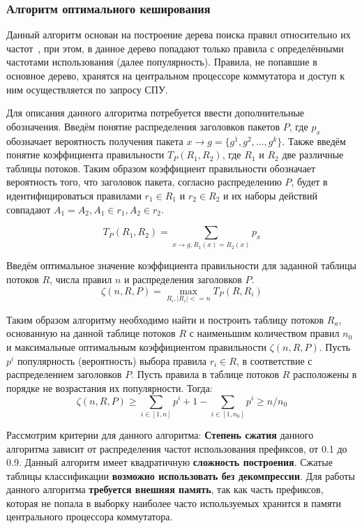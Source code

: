 \documentclass[oneside,final,12pt]{extarticle}
\begin{document}
        \subsubsection{Алгоритм оптимального кеширования}
            Данный алгоритм основан на построение дерева поиска правил относительно их частот~\cite{rottenstreich2016optimal}, при этом, в данное дерево
            попадают только правила с определёнными частотами использования (далее популярность). 
            Правила, не попавшие в основное дерево, хранятся на центральном процессоре коммутатора и  доступ к ним осуществляется по запросу СПУ.
            
            Для описания данного алгоритма потребуется ввести дополнительные обозначения. Введём понятие распределения заголовков пакетов \(P\),
            где \(p_x\) обозначает вероятность получения пакета \(x \rightarrow g=\{g^1,g^2,\ldots,g^k\}\).
            Также введём понятие коэффициента правильности \(T_P(R_1, R_2)\), где \(R_1\) и \(R_2\) две различные таблицы потоков. 
            Таким образом коэффициент правильности обозначает вероятность того, что заголовок пакета, согласно распределению \(P\),
            будет в идентифицироваться правилами \(r_1 \in R_1\) и \(r_2 \in R_2\) и их наборы действий совпадают \(A_1 = A_2, A_1 \in r_1, A_2 \in r_2\).
            
            \[T_P(R_1, R_2) = \sum_{x \rightarrow g, R_1(x) = R_2(x)} p_x\]

            Введём оптимальное значение коэффициента правильности для заданной таблицы потоков \(R\), числа правил \(n\) и распределения заголовков \(P\).
            \[\zeta(n, R, P) = \max_{R_i, |R_i| <= n} T_P(R, R_i)\]
            
            Таким образом алгоритму необходимо найти и построить таблицу потоков \(R_a\), основанную на данной таблице потоков \(R\)
            с наименьшим количеством правил \(n_0\) и максимальные оптимальным коэффициентом правильности \(\zeta(n, R, P)\).
            Пусть \(p^i\) популярность (вероятность) выбора правила \(r_i \in R\), в соответствие с распределением заголовков \(P\). Пусть
            правила в таблице потоков \(R\) расположены в порядке не возрастания их популярности. Тогда:
            \[\zeta(n, R, P) \geq \sum_{i \in [1, n]} p^i + 1 - \sum_{i \in [1, n_0]} p^i \geq n/n_0\]

            Рассмотрим критерии для данного алгоритма: \textbf{Степень сжатия} данного алгоритма зависит от распределения частот использования префиксов, от 0.1 до 0.9.
            Данный алгоритм имеет квадратичную \textbf{сложность построения}. Сжатые таблицы классификации \textbf{возможно использовать без декомпрессии}.
            Для работы данного алгоритма \textbf{требуется внешняя память}, так как часть префиксов, которая не попала в выборку наиболее часто используемых хранится в
            памяти центрального процессора коммутатора.
\end{document}
